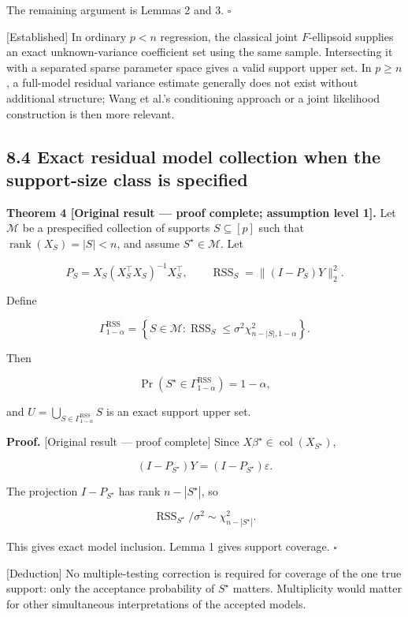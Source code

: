 \documentclass[
  english,
  11pt,
  a4paper,
]{article}
\begin{document}
The remaining argument is Lemmas 2 and 3. $\square$

{[}Established{]} In ordinary $p<n$ regression, the classical joint
$F$-ellipsoid supplies an exact unknown-variance coefficient set using
the same sample. Intersecting it with a separated sparse parameter space
gives a valid support upper set. In $p\ge n$, a full-model residual
variance estimate generally does not exist without additional structure;
Wang et al.'s conditioning approach or a joint likelihood construction
is then more relevant.

\subsection{8.4 Exact residual model collection when the support-size
class is
specified}\label{exact-residual-model-collection-when-the-support-size-class-is-specified}

\textbf{Theorem 4 {[}Original result --- proof complete; assumption
level 1{]}.} Let $\mathcal M$ be a prespecified collection of supports
$S\subseteq[p]$ such that $\operatorname{rank}(X_S)=|S|<n$, and
assume $S^\star\in\mathcal M$. Let

$$
P_S=X_S(X_S^\top X_S)^{-1}X_S^\top,
\qquad
\operatorname{RSS}_S=\lVert(I-P_S)Y\rVert_2^2.
$$

Define

$$
\Gamma_{1-\alpha}^{\mathrm{RSS}}
=
\left\{S\in\mathcal M:
\operatorname{RSS}_S
\le
\sigma^2\chi^2_{n-|S|,1-\alpha}
\right\}.
$$

Then

$$
\Pr(S^\star\in\Gamma_{1-\alpha}^{\mathrm{RSS}})=1-\alpha,
$$

and $U=\bigcup_{S\in\Gamma_{1-\alpha}^{\mathrm{RSS}}}S$ is an exact
support upper set.

\textbf{Proof.} {[}Original result --- proof complete{]} Since
$X\beta^\star\in\operatorname{col}(X_{S^\star})$,

$$
(I-P_{S^\star})Y=(I-P_{S^\star})\varepsilon.
$$

The projection $I-P_{S^\star}$ has rank $n-|S^\star|$, so

$$
\operatorname{RSS}_{S^\star}/\sigma^2\sim\chi^2_{n-|S^\star|}.
$$

This gives exact model inclusion. Lemma 1 gives support coverage.
$\square$

{[}Deduction{]} No multiple-testing correction is required for coverage
of the one true support: only the acceptance probability of $S^\star$
matters. Multiplicity would matter for other simultaneous
interpretations of the accepted models.
\end{document}
